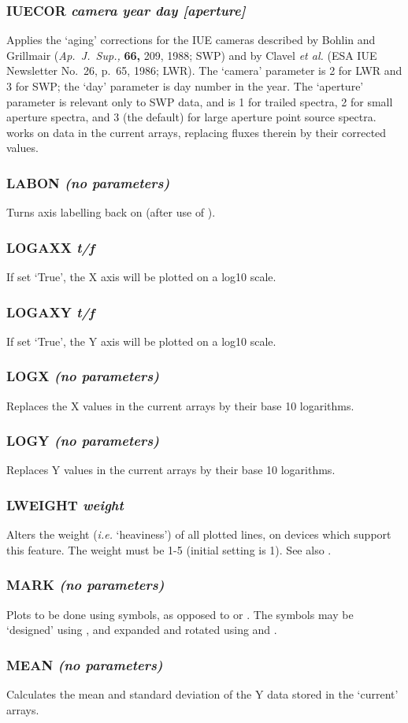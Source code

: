\documentclass[twoside,11pt,noabs,nolof]{starlink}
\providecommand{\dipcom}[3]{\subsubsection*{\label{COM:#1}\textbf{#1} \emph{#2}}}
\begin{document}
\dipcom{IUECOR}{camera year day [aperture]}{Applies 'aging' corrections for the IUE cameras}
Applies the `aging' corrections for the IUE cameras described by
Bohlin and Grillmair (\textit{Ap.~J.~Sup.,} \textbf{66,} 209, 1988; SWP)
and by Clavel \textit{et al.} (ESA IUE Newsletter No.~26, p.~65, 1986;
LWR). The `camera' parameter is 2 for LWR and 3 for SWP; the `day'
parameter is day number in the year. The `aperture' parameter is
relevant only to SWP data, and is 1 for trailed spectra, 2 for small
aperture spectra, and 3 (the default) for large aperture point source
spectra.   works on data in the current arrays, replacing
fluxes therein by their corrected values.

\dipcom{LABON}{(no parameters)}{Turns axis labelling back on}
Turns axis labelling back on (after use of ).

\dipcom{LOGAXX}{t/f}{Causes X axes to be plotted on a log10 scale}
If set `True', the X axis will be plotted on a log10 scale.

\dipcom{LOGAXY}{t/f}{Causes Y axes to be plotted on a log10 scale}
If set `True', the Y axis will be plotted on a log10 scale.

\dipcom{LOGX}{(no parameters)}{Takes the base 10 logarithms of the current X values}
Replaces the X values in the current arrays by their base 10 logarithms.

\dipcom{LOGY}{(no parameters)}{Takes the base 10 logarithms of the current Y values}
Replaces Y values in the current arrays by their base 10 logarithms.

\dipcom{LWEIGHT}{weight}{Sets the weight (heaviness) of all plotted lines}
Alters the weight (\emph{i.e.} `heaviness') of all plotted lines, on
devices which support this feature. The weight must be 1-5 (initial
setting is 1). See also .

\dipcom{MARK}{(no parameters)}{Causes plots to be done using symbols}
Plots to be done using symbols, as opposed to   or .  The
symbols may be `designed' using ,  and expanded and rotated using
  and .

\dipcom{MEAN}{(no parameters)}{Find the mean and standard deviation of the current Y values}
Calculates the mean and standard deviation of the Y data stored in the
`current' arrays.
\end{document}
